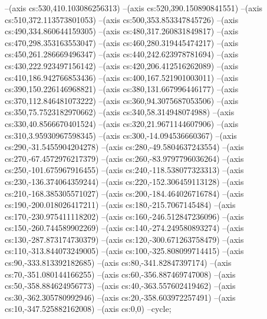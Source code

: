 --(axis cs:530,410.103086256313)
--(axis cs:520,390.150890841551)
--(axis cs:510,372.113573801053)
--(axis cs:500,353.853347845726)
--(axis cs:490,334.860644159305)
--(axis cs:480,317.260831849817)
--(axis cs:470,298.353163553047)
--(axis cs:460,280.319445474217)
--(axis cs:450,261.286669496347)
--(axis cs:440,242.623978781694)
--(axis cs:430,222.923497156142)
--(axis cs:420,206.412516262089)
--(axis cs:410,186.942766853436)
--(axis cs:400,167.521901003011)
--(axis cs:390,150.226146968821)
--(axis cs:380,131.667996446177)
--(axis cs:370,112.846481073222)
--(axis cs:360,94.3075687053506)
--(axis cs:350,75.7523182970662)
--(axis cs:340,58.314948074988)
--(axis cs:330,40.8566670401524)
--(axis cs:320,21.9671144607906)
--(axis cs:310,3.95930967598345)
--(axis cs:300,-14.094536660367)
--(axis cs:290,-31.5455904204278)
--(axis cs:280,-49.5804637243554)
--(axis cs:270,-67.4572976217379)
--(axis cs:260,-83.9797796036264)
--(axis cs:250,-101.675967916455)
--(axis cs:240,-118.538077323313)
--(axis cs:230,-136.374064359244)
--(axis cs:220,-152.306459113128)
--(axis cs:210,-168.385305571027)
--(axis cs:200,-184.464026716784)
--(axis cs:190,-200.018026417211)
--(axis cs:180,-215.7067145484)
--(axis cs:170,-230.975411118202)
--(axis cs:160,-246.512847236096)
--(axis cs:150,-260.744589902269)
--(axis cs:140,-274.249580893274)
--(axis cs:130,-287.873174730379)
--(axis cs:120,-300.671263758479)
--(axis cs:110,-313.844073249005)
--(axis cs:100,-325.808099714415)
--(axis cs:90,-333.813392182685)
--(axis cs:80,-341.82847397174)
--(axis cs:70,-351.080144166255)
--(axis cs:60,-356.887469747008)
--(axis cs:50,-358.884624956773)
--(axis cs:40,-363.557602419462)
--(axis cs:30,-362.305780992946)
--(axis cs:20,-358.603972257491)
--(axis cs:10,-347.525882162008)
--(axis cs:0,0)
--cycle;

